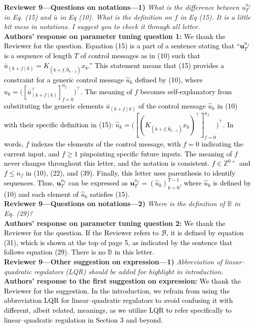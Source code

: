 \textbf{Reviewer 9—Questions on notations—1)}\textit{ %
What is the difference between $u^{n_f}_T$ in Eq. (15) and $\bar{u}$ in Eq (10). What is the definition on $f$ in Eq (15). It is a little bit mess in notations. I suggest you to check it through all letter.}\\[2mm]
\textbf{Authors' response on parameter tuning question 1:} \textcolor{black}{We thank the Reviewer for the question. Equation (15) is a part of a sentence stating that ``$\bm{u}_{T}^{n_f}$ is a sequence of length $T$ of control messages as in (10) such that $\bar{u}_{(k+f\mid k)} = K_{(k+f,\hat{\theta}_{k-1})}x_k$.'' This statement means that (15) provides a constraint for a generic control message $\hat{u}_k$ defined by (10), where $\hat{u}_k = \big([\bar{u}_{(k+f\mid k)}^{\top}]_{f=0}^{n_f}\big)^{\!\top}$. 
The meaning of $f$ becomes self-explanatory from substituting the generic elements $\bar{u}_{(k+f\mid k)}$ of the control message $\hat{u}_k$ in (10) with their specific definition in (15):
$\hat{u}_k = \Big([(K_{(k+f,\hat{\theta}_{k-1})}x_k)^{\top}]_{f=0}^{n_f}\Big)^{\!\top}$. In words, $f$ indexes the elements of the control message, %
with $f=0$ indicating the current input, and $f\geq 1$ pinpointing specific future inputs. The meaning of $f$ never changes throughout this letter, and the notation is consistent. 
$f \in \mathbb{Z}^{0+}$ and $f\leq n_f$ in (10), (22), and (39). Finally, this letter uses parenthesis to identify sequences. Thus, $\bm{u}_{T}^{n_f}$ can be expressed as $\bm{u}_{T}^{n_f} = (\hat{u}_k)_{k=0}^{T-1}$, where $\hat{u}_k$ is defined by (10) and each element of $\hat{u}_k$ satisfies (15). 
}\\[4mm]
\textbf{Reviewer 9—Questions on notations—2)}\textit{ %
Where is the definition of $\mathbb{B}$ in Eq. (29)?}\\[2mm]
\textbf{Authors' response on parameter tuning question 2:} \textcolor{black}{We thank the Reviewer for the question. If the Reviewer refers to $\mathcal{B}$, it is defined by equation (31), which is shown at the top of page 5, as indicated by the sentence that follows equation (29). There is no $\mathbb{B}$ in this letter.}\\[4mm]
\textbf{Reviewer 9—Other suggestion on expression—1)}\textit{ %
Abbreviation of linear–quadratic regulators (LQR) should be added for highlight in introduction.}\\[2mm]
\textbf{Authors' response to the first suggestion on expression:} \textcolor{black}{
We thank the Reviewer for the suggestion. In the introduction, we refrain from using the abbreviation LQR for linear–quadratic regulators to avoid confusing it with different, albeit related, meanings, as we utilize LQR to refer specifically to linear–quadratic regulation in Section 3 and beyond.}\\[4mm]
